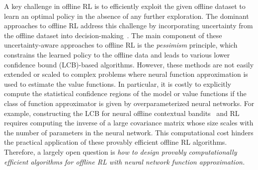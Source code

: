 \documentclass{article} \usepackage{iclr2023/iclr2023_conference,times}
\begin{document}
A key challenge in offline RL is to efficiently exploit the given offline dataset to learn an optimal policy in the absence of any further exploration. The dominant approaches to offline RL address this challenge by incorporating uncertainty from the offline dataset into  decision-making~\citep{buckman2020importance, jin2021pessimism, xiao2021optimality, nguyen2021offline, ghasemipour2022so, an2021uncertainty, bai2022pessimistic}. The main component of these uncertainty-aware approaches to offline RL is the \emph{pessimism} principle, which constrains the learned policy to the offline data and leads to various lower confidence bound (LCB)-based algorithms. However, these methods are not easily extended or scaled to complex problems where neural function approximation is used to estimate the value functions. In particular, it is costly to explicitly compute the statistical confidence regions of the model or value functions if the class of function approximator is given by overparameterized neural networks. For example, constructing the LCB for neural offline contextual bandits~\citep{nguyen2021offline} and RL \citep{xu2022provably} requires computing the inverse of a large covariance matrix whose size scales with the number of parameters in the neural network. This computational cost hinders the practical application of these provably efficient offline RL algorithms. Therefore, a largely open question is \emph{how to design provably  computationally efficient algorithms for offline RL with neural network function approximation.} 
\end{document}
